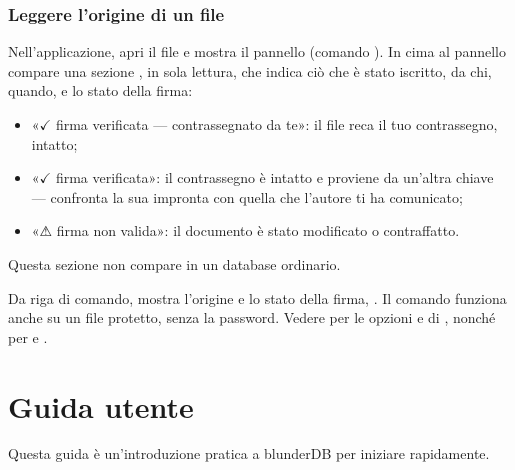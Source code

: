 \documentclass[letterpaper,10pt,italian]{sphinxmanual}
\begin{document}
\subsubsection{Leggere l’origine di un file}
\label{\detokenize{manuel:lire-l-origine-d-un-fichier}}
\sphinxAtStartPar
Nell’applicazione, apri il file e mostra il pannello  (comando ). In cima al pannello compare una sezione , in sola lettura, che indica ciò che è stato iscritto, da chi, quando, e lo stato della firma:
\begin{itemize}
\item {} 
\sphinxAtStartPar
«\(\checkmark\) firma verificata — contrassegnato da te»: il file reca il tuo contrassegno, intatto;

\item {} 
\sphinxAtStartPar
«\(\checkmark\) firma verificata»: il contrassegno è intatto e proviene da un’altra chiave — confronta la sua impronta con quella che l’autore ti ha comunicato;

\item {} 
\sphinxAtStartPar
«⚠ firma non valida»: il documento è stato modificato o contraffatto.

\end{itemize}

\sphinxAtStartPar
Questa sezione non compare in un database ordinario.

\sphinxAtStartPar
Da riga di comando,  mostra l’origine e lo stato della firma, . Il comando funziona anche su un file protetto, senza la password. Vedere  per le opzioni  e  di , nonché per  e .

\sphinxstepscope


\section{Guida utente}
\label{\detokenize{guide_utilisateur:guide-utilisateur}}\label{\detokenize{guide_utilisateur:id1}}\label{\detokenize{guide_utilisateur::doc}}
\sphinxAtStartPar
Questa guida è un’introduzione pratica a blunderDB per iniziare rapidamente.
\end{document}
